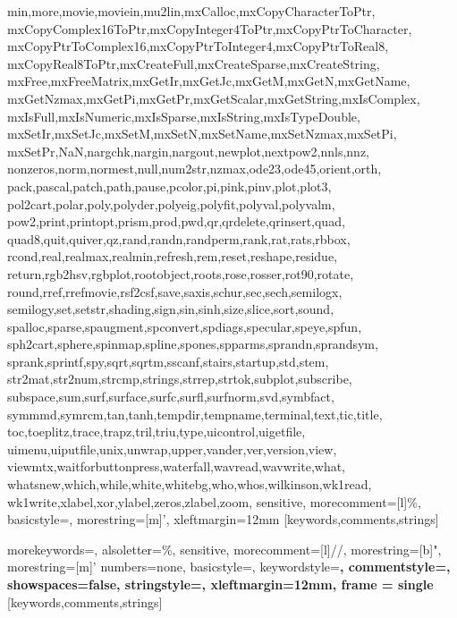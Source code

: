{{      min,more,movie,moviein,mu2lin,mxCalloc,mxCopyCharacterToPtr,%
      mxCopyComplex16ToPtr,mxCopyInteger4ToPtr,mxCopyPtrToCharacter,%
      mxCopyPtrToComplex16,mxCopyPtrToInteger4,mxCopyPtrToReal8,%
      mxCopyReal8ToPtr,mxCreateFull,mxCreateSparse,mxCreateString,%
      mxFree,mxFreeMatrix,mxGetIr,mxGetJc,mxGetM,mxGetN,mxGetName,%
      mxGetNzmax,mxGetPi,mxGetPr,mxGetScalar,mxGetString,mxIsComplex,%
      mxIsFull,mxIsNumeric,mxIsSparse,mxIsString,mxIsTypeDouble,%
      mxSetIr,mxSetJc,mxSetM,mxSetN,mxSetName,mxSetNzmax,mxSetPi,%
      mxSetPr,NaN,nargchk,nargin,nargout,newplot,nextpow2,nnls,nnz,%
      nonzeros,norm,normest,null,num2str,nzmax,ode23,ode45,orient,orth,%
      pack,pascal,patch,path,pause,pcolor,pi,pink,pinv,plot,plot3,%
      pol2cart,polar,poly,polyder,polyeig,polyfit,polyval,polyvalm,%
      pow2,print,printopt,prism,prod,pwd,qr,qrdelete,qrinsert,quad,%
      quad8,quit,quiver,qz,rand,randn,randperm,rank,rat,rats,rbbox,%
      rcond,real,realmax,realmin,refresh,rem,reset,reshape,residue,%
      return,rgb2hsv,rgbplot,rootobject,roots,rose,rosser,rot90,rotate,%
      round,rref,rrefmovie,rsf2csf,save,saxis,schur,sec,sech,semilogx,%
      semilogy,set,setstr,shading,sign,sin,sinh,size,slice,sort,sound,%
      spalloc,sparse,spaugment,spconvert,spdiags,specular,speye,spfun,%
      sph2cart,sphere,spinmap,spline,spones,spparms,sprandn,sprandsym,%
      sprank,sprintf,spy,sqrt,sqrtm,sscanf,stairs,startup,std,stem,%
      str2mat,str2num,strcmp,strings,strrep,strtok,subplot,subscribe,%
      subspace,sum,surf,surface,surfc,surfl,surfnorm,svd,symbfact,%
      symmmd,symrcm,tan,tanh,tempdir,tempname,terminal,text,tic,title,%
      toc,toeplitz,trace,trapz,tril,triu,type,uicontrol,uigetfile,%
      uimenu,uiputfile,unix,unwrap,upper,vander,ver,version,view,%
      viewmtx,waitforbuttonpress,waterfall,wavread,wavwrite,what,%
      whatsnew,which,while,white,whitebg,who,whos,wilkinson,wk1read,%
      wk1write,xlabel,xor,ylabel,zeros,zlabel,zoom},%
   sensitive,%
   morecomment=[l]\%,%
   basicstyle=\footnotesize\ttfamily,%
   morestring=[m]',%
   xleftmargin=12mm
  }[keywords,comments,strings]%

%
  {morekeywords={},%
   alsoletter=\%,%
   sensitive,%
   morecomment=[l]//,%
   morestring=[b]",%
   morestring=[m]'%
   numbers=none,%
   basicstyle=\footnotesize\ttfamily,%
   keywordstyle=\bfseries,%
   commentstyle=\bfseries,%
   showspaces=false,%
   stringstyle=\bfseries, 
   xleftmargin=12mm,
   frame = single %
  }[keywords,comments,strings]%

\DeclareMathOperator{\lcm}{lcm} 


\usepackage[hmargin=3cm,vmargin=3cm]{geometry}


